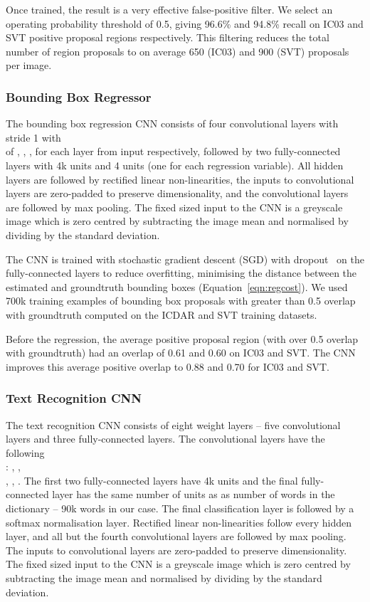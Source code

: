 \documentclass[twocolumn]{svjour3}          \smartqed  \usepackage{epsfig}
\begin{document}
Once trained, the result is a very effective false-positive filter. We select an operating probability threshold of 0.5, giving 96.6\% and 94.8\% recall on IC03 and SVT positive proposal regions respectively. This filtering reduces the total number of region proposals to on average 650 (IC03) and 900 (SVT) proposals per image. 

\subsubsection{Bounding Box Regressor}
The bounding box regression CNN consists of four convolutional layers with stride 1 with \\ of , , ,  for each layer from input respectively, followed by two fully-connected layers with 4k units and 4 units (one for each regression variable). All hidden layers are followed by rectified linear non-linearities, the inputs to convolutional layers are zero-padded to preserve dimensionality, and the convolutional layers are followed by  max pooling. The fixed sized input to the CNN is a  greyscale image which is zero centred by subtracting the image mean and normalised by dividing by the standard deviation.

The CNN is trained with stochastic gradient descent (SGD) with dropout~\cite{Hinton12} on the fully-connected layers to reduce overfitting, minimising the  distance between the estimated and groundtruth bounding boxes (Equation~\ref{eqn:regcost}). We used 700k training examples of bounding box proposals with greater than 0.5 overlap with groundtruth computed on the ICDAR and SVT training datasets.

Before the regression, the average positive proposal region (with over 0.5 overlap with groundtruth) had an overlap of 0.61 and 0.60 on IC03 and SVT. The CNN improves this average positive overlap to 0.88 and 0.70 for IC03 and SVT.

\subsubsection{Text Recognition CNN}
The text recognition CNN consists of eight weight layers -- five convolutional layers and three fully-connected layers. The convolutional layers have the following \\: , , \\, , . The first two fully-connected layers have 4k units and the final fully-connected layer has the same number of units as as number of words in the dictionary -- 90k words in our case. The final classification layer is followed by a softmax normalisation layer. Rectified linear non-linearities follow every hidden layer, and all but the fourth convolutional layers are followed by  max pooling. The inputs to convolutional layers are zero-padded to preserve dimensionality. The fixed sized input to the CNN is a  greyscale image which is zero centred by subtracting the image mean and normalised by dividing by the standard deviation. 
\end{document}
